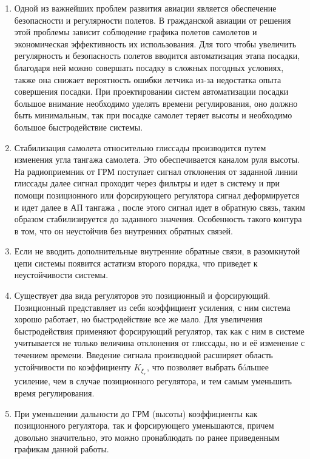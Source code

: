\begin{enumerate}
    \item Одной из важнейших проблем развития авиации является обеспечение безопасности и регулярности полетов. В гражданской авиации от решения этой проблемы зависит соблюдение графика полетов самолетов и экономическая эффективность их использования. Для того чтобы увеличить регулярность и безопасность полетов вводится автоматизация этапа посадки, благодаря ней можно совершать посадку в сложных погодных условиях, также она снижает вероятность ошибки летчика из-за недостатка опыта совершения посадки. При проектировании систем автоматизации посадки большое внимание необходимо уделять времени регулирования, оно должно быть минимальным, так при посадке самолет теряет высоты и необходимо большое быстродействие системы. 
    \item Стабилизация самолета относительно глиссады производится путем изменения угла тангажа самолета. Это обеспечивается каналом руля высоты. На радиоприемник от ГРМ поступает сигнал отклонения от заданной линии глиссады далее сигнал проходит через фильтры и идет в систему и при помощи позиционного или форсирующего регулятора сигнал деформируется и идет далее в АП тангажа , после этого сигнал идет в обратную связь, таким образом стабилизируется до заданного значения. Особенность такого контура в том, что он неустойчив без внутренних обратных связей.
    \item Если не вводить дополнительные внутренние обратные связи, в разомкнутой цепи системы появится астатизм второго порядка, что приведет к неустойчивости системы.
    \item Существует два вида регуляторов это позиционный и форсирующий. Позиционный представляет из себя коэффициент усиления, с ним система хорошо работает, но быстродействие все же мало. Для увеличения быстродействия применяют форсирующий регулятор, так как с ним в системе учитывается не только величина отклонения от глиссады, но и её изменение с течением времени. Введение сигнала производной расширяет область устойчивости по коэффициенту $K_{\dot{\xi}_\text{Г}}$, что позволяет выбрать бóльшее усиление, чем в случае позиционного регулятора, и тем самым уменьшить время регулирования.
    \item При уменьшении дальности до ГРМ (высоты) коэффициенты как позиционного регулятора, так и форсирующего уменьшаются, причем довольно значительно, это можно пронаблюдать по ранее приведенным графикам данной работы.  
\end{enumerate}

